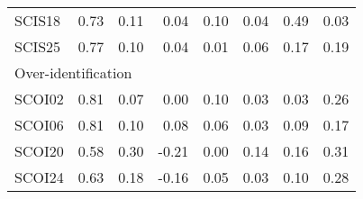 \begin{longtable}{lrrrrrrr}
SCIS18 & 0.73 & 0.11 & 0.04 & 0.10 & 0.04 & 0.49 & 0.03 \\ 
SCIS25 & 0.77 & 0.10 & 0.04 & 0.01 & 0.06 & 0.17 & 0.19 \\ 
\midrule
\multicolumn{8}{l}{Over-identification} \\ 
\midrule
SCOI02 & 0.81 & 0.07 & 0.00 & 0.10 & 0.03 & 0.03 & 0.26 \\ 
SCOI06 & 0.81 & 0.10 & 0.08 & 0.06 & 0.03 & 0.09 & 0.17 \\ 
SCOI20 & 0.58 & 0.30 & -0.21 & 0.00 & 0.14 & 0.16 & 0.31 \\ 
SCOI24 & 0.63 & 0.18 & -0.16 & 0.05 & 0.03 & 0.10 & 0.28 \\ 
\bottomrule
\end{longtable}

